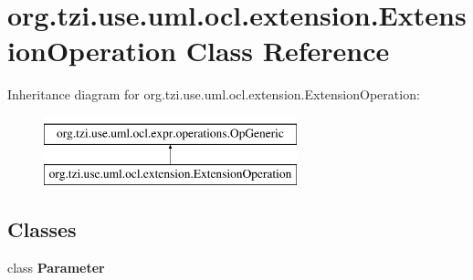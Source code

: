 \hypertarget{classorg_1_1tzi_1_1use_1_1uml_1_1ocl_1_1extension_1_1_extension_operation}{\section{org.\-tzi.\-use.\-uml.\-ocl.\-extension.\-Extension\-Operation Class Reference}
\label{classorg_1_1tzi_1_1use_1_1uml_1_1ocl_1_1extension_1_1_extension_operation}
}
Inheritance diagram for org.\-tzi.\-use.\-uml.\-ocl.\-extension.\-Extension\-Operation\-:\begin{figure}[H]
\begin{center}
\leavevmode
\includegraphics[height=2.000000cm]{classorg_1_1tzi_1_1use_1_1uml_1_1ocl_1_1extension_1_1_extension_operation}
\end{center}
\end{figure}
\subsection*{Classes}
\begin{DoxyCompactItemize}
\item 
class {\bfseries Parameter}
\end{DoxyCompactItemize}
